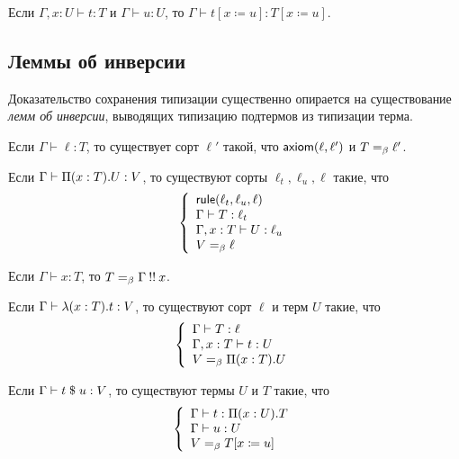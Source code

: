 \begin{lemma}[Подстановка]
Если $\Gamma,x:U\vdash t:T$ и $\Gamma\vdash u:U$, то
$\Gamma\vdash t[x\coloneqq u]:T[x\coloneqq u]$.
\end{lemma}

\subsection{Леммы об инверсии}

Доказательство сохранения типизации существенно
опирается на существование \emph{лемм об инверсии},
выводящих типизацию подтермов из типизации терма.

\begin{lemma}
Если $\Gamma \vdash \ell : T$, то существует
сорт $\ell'$ такой, что $\mathsf{axiom}(\ell, \ell')$ и
$T =_{\beta} \ell'$.
\end{lemma}

\begin{lemma}
Если $\Gamma \vdash \Pi(x:T).U : V$, то
существуют сорты $\ell_t, \ell_u, \ell$ такие, что
\[\left\{\begin{array}{l}
    \mathsf{rule}(\ell_t, \ell_u, \ell) \\
    \Gamma \vdash T : \ell_t \\
    \Gamma,x:T \vdash U : \ell_u \\
    V =_{\beta} \ell
\end{array}\right.\]
\end{lemma}

\begin{lemma}
Если $\Gamma \vdash x : T$, то
$T =_{\beta} \Gamma \mathbin{!!} x$.
\end{lemma}

\begin{lemma}
Если $\Gamma \vdash \lambda(x:T).t : V$, то
существуют сорт $\ell$ и терм $U$ такие, что
\[\left\{\begin{array}{l}
    \Gamma \vdash T : \ell \\
    \Gamma,x:T \vdash t : U \\
    V =_{\beta} \Pi(x:T).U
\end{array}\right.\]
\end{lemma}

\begin{lemma}
Если $\Gamma \vdash t\;\$\;u : V$, то
существуют термы $U$ и $T$ такие, что
\[\left\{\begin{array}{l}
    \Gamma \vdash t : \Pi(x:U).T \\
    \Gamma \vdash u : U \\
    V =_{\beta} T[x\coloneqq u]
\end{array}\right.\]
\end{lemma}

